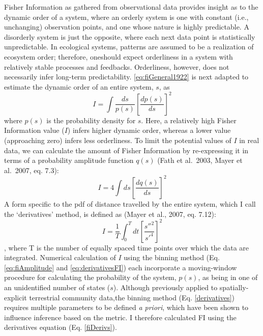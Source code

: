 \documentclass[12pt,twoside,openany]{reedthesis}
\begin{document}
Fisher Information as gathered from observational data provides insight as to the dynamic order of a system, where an orderly system is one with constant (i.e., unchanging) observation points, and one whose nature is highly predictable. A disorderly system is just the opposite, where each next data point is statistically unpredictable. In ecological systems, patterns are assumed to be a realization of ecosystem order; therefore, oneshould expect orderliness in a system with relatively stable processes and feedbacks. Orderliness, however, does not necessarily infer long-term predictability. \eqref{eq:fiGeneral1922} is next adapted to estimate the dynamic order of an entire system, \(s\), as
\begin{equation} 
I = \int \frac{ds}{p(s)}\left[\frac{dp(s)}{ds}\right]^2
\end{equation}
where \(p(s)\) is the probability density for \(s\). Here, a relatively high Fisher Information value (\(I\)) infers higher dynamic order, whereas a lower value (approaching zero) infers less orderliness. To limit the potential values of \(I\) in real data, we can calculate the amount of Fisher Information by re-expressing it in terms of a probability amplitude function \(q(s)\) (Fath et al.~2003, Mayer et al.~2007, eq. 7.3):
\begin{equation}
I = 4 \int ds\left[\frac{dq(s)}{ds}\right]^2
\end{equation}
A form specific to the pdf of distance travelled by the entire system, which I call the `derivatives' method, is defined as (Mayer et al., 2007, eq. 7.12):
\begin{equation}
I = \frac{1}{T} \int_0^T dt\left[\frac{s''^2}{s'^4}\right]^2
\end{equation},
where T is the number of equally spaced time points over which the data are integrated. Numerical calculation of \(I\) using the binning method (Eq. \eqref{eq:fiAmplitude} and \eqref{eq:derivativesFI}) each incorporate a moving-window procedure for calculating the probability of the system, \(p(s)\), as being in one of an unidentified number of states (\(s\)). Although previously applied to spatially-explicit terrestrial community data,the binning method (Eq. \ref{derivatives}) requires multiple parameters to be defined \emph{a priori}, which have been shown to influence inference based on the metric. I therefore calculated FI using the derivatives equation (Eq. \ref{fiDerivs}).
\end{document}
